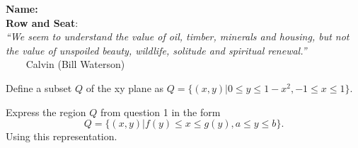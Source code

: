 \documentclass[12pt,fleqn]{exam}
\newcommand{\class}{MATH 202, Fall \the\year}
\begin{document}
\large
\noindent\makebox[3.0truein][l]{\textbf{\class}}
\textbf{Name:} \hrulefill \\
\noindent {}
\textbf{Row and Seat}:\hrulefill\\





\noindent \emph{“We seem to understand the value of oil, timber, minerals and housing, but not the 
value of unspoiled beauty, wildlife, solitude and spiritual renewal.”}\\
  $\phantom{xxx}$ \hfill {\sc Calvin (Bill Waterson)}


\begin{questions} 
    
 \question Define a subset $Q$ of the xy plane as 
 $Q = \{ (x,y) | 0 \leq y \leq 1-x^2, -1 \leq x \leq 1\}$.


\question Express the region $Q$ from question 1 in the
form 
\begin{equation}
Q = \{(x,y) | f(y) \leq x \leq g(y), a \leq y \leq b \}.
\end{equation}
Using this representation.

\end{questions}
\end{document}
